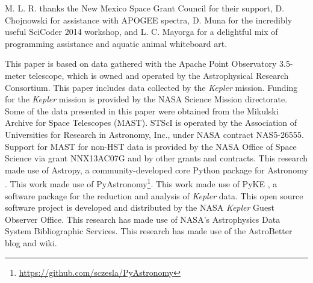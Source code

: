 \acknowledgments
M. L. R. thanks the New Mexico Space Grant Council for their support, D. Chojnowski for assistance with APOGEE spectra, D. Muna for the incredibly useful SciCoder 2014 workshop, and L. C. Mayorga for a delightful mix of programming assistance and aquatic animal whiteboard art.

This paper is based on data gathered with the Apache Point Observatory 3.5-meter telescope, which is owned and operated by the Astrophysical Research Consortium. This paper includes data collected by the \emph{Kepler} mission. Funding for the \emph{Kepler} mission is provided by the NASA Science Mission directorate. Some of the data presented in this paper were obtained from the Mikulski Archive for Space Telescopes (MAST). STScI is operated by the Association of Universities for Research in Astronomy, Inc., under NASA contract NAS5-26555. Support for MAST for non-HST data is provided by the NASA Office of Space Science via grant NNX13AC07G and by other grants and contracts. This research made use of Astropy, a community-developed core Python package for Astronomy \citep{astropy}. This work made use of PyAstronomy\footnote{\url{https://github.com/sczesla/PyAstronomy}}. This work made use of PyKE \citep{pyke}, a software package for the reduction and analysis of \emph{Kepler} data. This open source software project is developed and distributed by the NASA \emph{Kepler} Guest Observer Office. This research has made use of NASA's Astrophysics Data System Bibliographic Services. This research has made use of the AstroBetter blog and wiki.